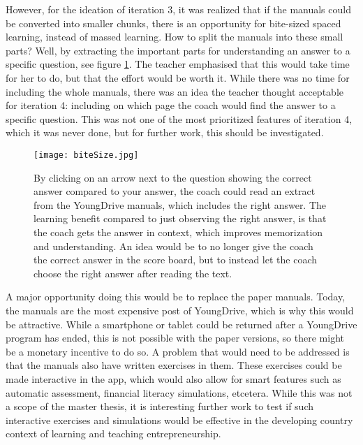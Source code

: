 However, for the ideation of iteration 3, it was realized that if the manuals could be converted into smaller chunks, there is an opportunity for bite-sized spaced learning, instead of massed learning. How to split the manuals into these small parts? Well, by extracting the important parts for understanding an answer to a specific question, see figure \ref{fig:bite-size}. The teacher emphasised that this would take time for her to do, but that the effort would be worth it. While there was no time for including the whole manuals, there was an idea the teacher thought acceptable for iteration 4: including on which page the coach would find the answer to a specific question. This was not one of the most prioritized features of iteration 4, which it was never done, but for further work, this should be investigated.

\begin{figure}[h]
    \centering
    \texttt{[image: biteSize.jpg]}
    \caption{By clicking on an arrow next to the question showing the correct answer compared to your answer, the coach could read an extract from the YoungDrive manuals, which includes the right answer. The learning benefit compared to just observing the right answer, is that the coach gets the answer in context, which improves memorization and understanding. An idea would be to no longer give the coach the correct answer in the score board, but to instead let the coach choose the right answer after reading the text.}
    \label{fig:bite-size}
\end{figure}

A major opportunity doing this would be to replace the paper manuals. Today, the manuals are the most expensive post of YoungDrive, which is why this would be attractive. While a smartphone or tablet could be returned after a YoungDrive program has ended, this is not possible with the paper versions, so there might be a monetary incentive to do so. A problem that would need to be addressed is that the manuals also have written exercises in them. These exercises could be made interactive in the app, which would also allow for smart features such as automatic assessment, financial literacy simulations, etcetera. While this was not a scope of the master thesis, it is interesting further work to test if such interactive exercises and simulations would be effective in the developing country context of learning and teaching entrepreneurship.
